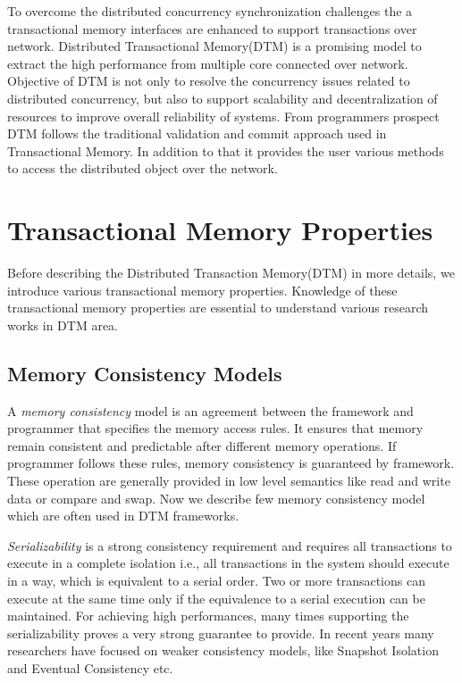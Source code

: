 \documentclass[12pt,english]{report}
\begin{document}
To overcome the distributed concurrency synchronization challenges the a transactional memory interfaces are enhanced to support transactions over network. Distributed Transactional Memory(DTM) is a promising model to extract the high performance from multiple core connected over network. Objective of DTM is not only to resolve the concurrency issues related to distributed concurrency, but also to support scalability and decentralization of resources to improve overall reliability of systems. From programmers prospect DTM follows the traditional validation and commit approach used in Transactional Memory. In addition to that it provides the user various methods to access the distributed object over the network. 

\section{Transactional Memory Properties}

Before describing the Distributed Transaction Memory(DTM) in more details, we introduce various transactional memory properties. Knowledge of these transactional memory properties are essential to understand various research works in DTM area.

\subsection{Memory Consistency Models}

A \textit{memory consistency} model is an agreement between the framework and programmer that specifies the memory access rules. It ensures that memory remain consistent and predictable after different memory operations. If programmer follows these rules, memory consistency is guaranteed by framework. These operation are generally provided in low level semantics like read and write data or compare and swap. Now we describe few memory consistency model which are often used in DTM frameworks.

\textit{Serializability} is a strong consistency requirement and requires all transactions to execute in a complete isolation i.e., all transactions in the system should execute in a way, which is equivalent to a serial order. Two or more transactions can execute at the same time only if the equivalence to a serial execution can be maintained. For achieving high performances, many times supporting the serializability proves a very strong guarantee to provide. In recent years many researchers have focused on weaker consistency models, like Snapshot Isolation and Eventual Consistency etc.
\end{document}
